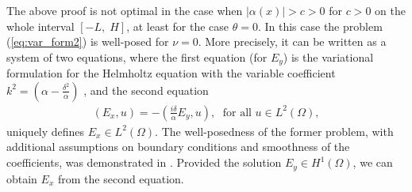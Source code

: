 \begin{remark} 
\label{remark:other}
The above proof is not optimal in the case when $\left|\alpha(x)\right|>c>0$ for $c>0$ on the whole interval $[-L,\; H]$, at least 
for the case $\theta=0$. In this case the problem (\ref{eq:var_form2}) is well-posed for $\nu=0$. More precisely, it can be written 
as a system of two equations, where the first equation (for $E_y$) is the variational formulation for the Helmholtz equation 
with the variable coefficient $k^2=(\alpha-\frac{\delta^2}{\alpha})$ , and the second equation 
\begin{align*}
  \left(E_x,u\right)=-\left(\frac{i\delta}{\alpha}E_y,u\right),\; \text{ for all } u\in L^{2}(\Omega), 
\end{align*}
uniquely defines $E_x\in L^{2}(\Omega)$. The well-posedness of the former problem, with additional assumptions on boundary conditions and smoothness of the coefficients, 
was demonstrated in \cite{LMIG_thesis}. Provided the solution $E_y\in H^{1}(\Omega)$, we can obtain $E_x$ from the second equation.
\end{remark}





